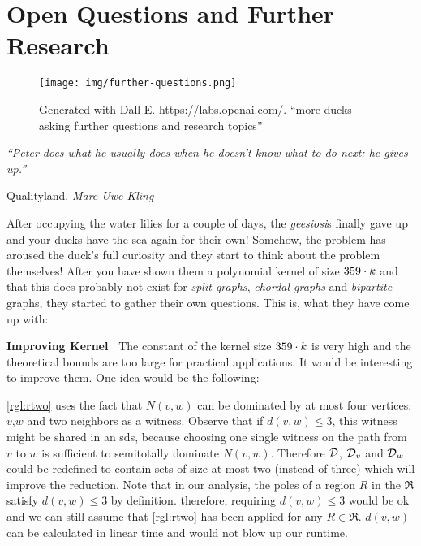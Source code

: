 \chapter{Open Questions and Further Research}\label{ch:closing}

\vspace*{-50pt}

\begin{figure}[ht]
        \texttt{[image: img/further-questions.png]}
        \captionsetup{textformat=empty,labelformat=blank}
        \caption[Generated with Dalle-E. Knowledge Cutoff 09-2022]{Generated with Dall-E. \url{https://labs.openai.com/}. ``more ducks asking further questions and research topics''}
\end{figure}

\epigraph{\itshape ``Peter does what he usually does when he doesn’t know what to do next: he gives up.''}{Qualityland, \textit{Marc-Uwe Kling}}

After occupying the water lilies for a couple of days, the \textit{geesiosi}s finally gave up and your ducks have the sea again for their own!
Somehow, the \sdom problem has aroused the duck's full curiosity and they start to think about the problem themselves! 
After you have shown them a polynomial kernel of size $359 \cdot k$ and that this does probably not exist for \textit{split graphs}, \textit{chordal graphs} and \textit{bipartite} graphs, they started to gather their own questions.
This is, what they have come up with:

\noindent \textbf{Improving Kernel~}
The constant of the kernel size $359 \cdot k$ is very high and the theoretical bounds are too large for practical applications. 
It would be interesting to improve them.
One idea would be the following:

\cref{rgl:rtwo} uses the fact that $N(v,w)$ can be dominated by at most four vertices: $v$,$w$ and two neighbors as a witness.
Observe that if $d(v,w) \leq 3$, this witness might be shared in an sds, because choosing one single witness on the path from $v$ to $w$ is sufficient to semitotally dominate $N(v,w)$.
Therefore $\mathcal{D}$, $\mathcal{D}_{v}$ and $\mathcal{D}_{w}$ could be redefined to contain sets of size at most two (instead of three) which will improve the reduction. 
Note that in our analysis, the poles of a region $R$ in the \dreg $\mathfrak{R}$ satisfy $d(v,w) \leq 3$ by definition.
therefore, requiring $d(v,w) \leq 3$ would be ok and we can still assume that \cref{rgl:rtwo} has been applied for any $R \in \mathfrak{R}$.
$d(v,w)$ can be calculated in linear time and would not blow up our runtime.


